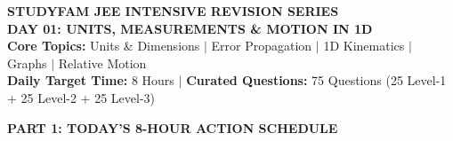 \documentclass[11pt,a4paper]{article}
\begin{document}
\begin{tcolorbox}[dayheader]
\begin{center}
  {\Large \textbf{\textsf{\textcolor{goldAccent}{STUDYFAM JEE INTENSIVE REVISION SERIES}}}}\\[3pt]
  {\LARGE \textbf{\textsf{DAY 01: UNITS, MEASUREMENTS \& MOTION IN 1D}}}\\[5pt]
  {\normalsize \textbf{\textsf{Core Topics:}} Units \& Dimensions $\vert$ Error Propagation $\vert$ 1D Kinematics $\vert$ Graphs $\vert$ Relative Motion}\\[3pt]
  {\footnotesize \textbf{Daily Target Time:} 8 Hours \quad $\vert$ \quad \textbf{Curated Questions:} 75 Questions (25 Level-1 + 25 Level-2 + 25 Level-3)}
\end{center}
\end{tcolorbox}

\vspace{6pt}

\begin{tcolorbox}[sectionbanner]
  {\large \textbf{\textsf{PART 1: TODAY'S 8-HOUR ACTION SCHEDULE}}}
\end{tcolorbox}
\vspace{2pt}
\end{document}
